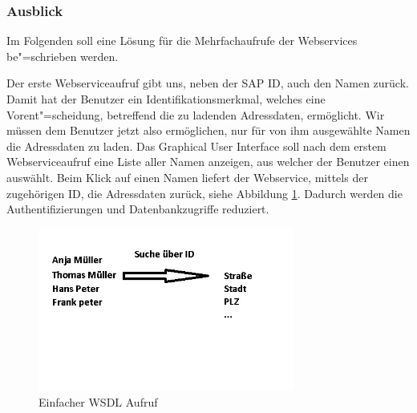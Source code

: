 \FloatBarrier
\subsubsection{Ausblick}

Im Folgenden soll eine Lösung für die Mehrfachaufrufe der Webservices be"=schrieben werden.

Der erste Webserviceaufruf gibt uns, neben der SAP ID, auch den Namen zurück. Damit hat der Benutzer ein Identifikationsmerkmal, 
welches eine Vorent"=scheidung, betreffend die zu ladenden Adressdaten, ermöglicht. Wir müssen dem Benutzer jetzt also ermöglichen, nur für 
von ihm ausgewählte Namen die Adressdaten zu laden. Das Graphical User Interface soll nach dem erstem Webserviceaufruf eine 
Liste aller Namen anzeigen, aus welcher der Benutzer einen auswählt. Beim Klick auf einen Namen liefert der Webservice, 
mittels der zugehörigen ID, die Adressdaten zurück, siehe Abbildung \ref{fig:sapbild2}. Dadurch werden die Authentifizierungen und Datenbankzugriffe reduziert.

\begin{figure}[h!t]
\begin{center}
\includegraphics[width=0.75\textwidth]{Bilder/presi2.jpg}
\end{center}
\caption{Einfacher WSDL Aufruf}
\label{fig:sapbild2}
\end{figure}
\FloatBarrier